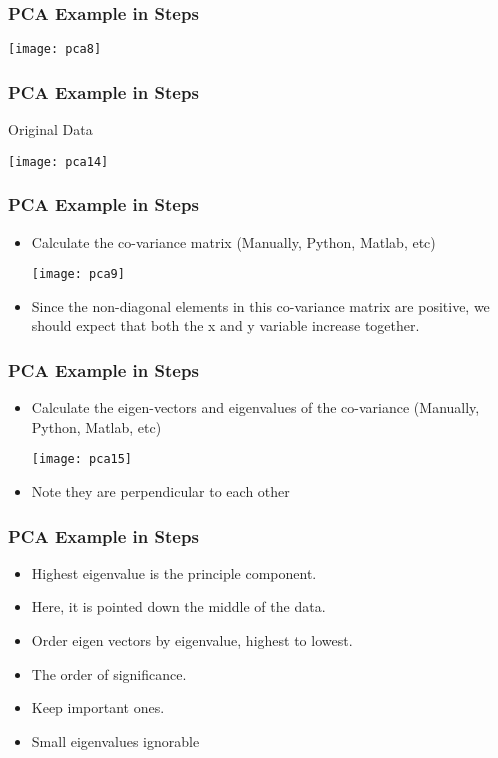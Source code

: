 \begin{frame}[fragile] \frametitle{PCA Example in Steps} 
\begin{center}
\texttt{[image: pca8]}
\end{center}
\end{frame}

\begin{frame}[fragile] \frametitle{PCA Example in Steps} 
Original Data
\begin{center}
\texttt{[image: pca14]}
\end{center}
\end{frame}


\begin{frame}[fragile] \frametitle{PCA Example in Steps} 
\begin{itemize}
\item Calculate the co-variance matrix (Manually, Python, Matlab, etc)
\begin{center}
\texttt{[image: pca9]}
\end{center}
\item Since the non-diagonal elements in this co-variance 
matrix are positive, we should expect that both the x 
and y variable increase together.
\end{itemize}
\end{frame}

\begin{frame}[fragile] \frametitle{PCA Example in Steps} 
\begin{itemize}
\item Calculate the eigen-vectors and eigenvalues of the co-variance  (Manually, Python, Matlab, etc)
\begin{center}
\texttt{[image: pca15]}
\end{center}
\item Note they are perpendicular to each other
\end{itemize}
\end{frame}

\begin{frame}[fragile] \frametitle{PCA Example in Steps} 
\begin{itemize}
\item Highest eigenvalue is the principle component.
\item Here, it is pointed down the middle of the data. 
\item Order eigen vectors by eigenvalue, highest to lowest. 
\item The order of significance. 
\item Keep important ones. 
\item Small eigenvalues ignorable
\end{itemize}
\end{frame}

